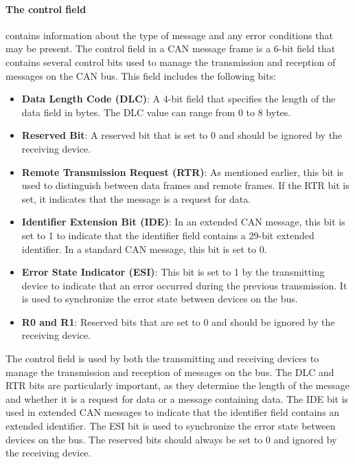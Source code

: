 \paragraph*{The control field} contains information about the type of message and any error conditions that may be present. 
The control field in a CAN message frame is a 6-bit field that contains several control bits used to manage the transmission and reception of messages on the CAN bus. 
This field includes the following bits:

\begin{itemize}
    \item \textbf{Data Length Code (DLC)}: A 4-bit field that specifies the length of the data field in bytes. The DLC value can range from 0 to 8 bytes.
    \item \textbf{Reserved Bit}: A reserved bit that is set to 0 and should be ignored by the receiving device.
    \item \textbf{Remote Transmission Request (RTR)}: As mentioned earlier, this bit is used to distinguish between data frames and remote frames. If the RTR bit is set, it indicates that the message is a request for data.
    \item \textbf{Identifier Extension Bit (IDE)}: In an extended CAN message, this bit is set to 1 to indicate that the identifier field contains a 29-bit extended identifier. In a standard CAN message, this bit is set to 0.
    \item \textbf{Error State Indicator (ESI)}: This bit is set to 1 by the transmitting device to indicate that an error occurred during the previous transmission. It is used to synchronize the error state between devices on the bus.
    \item \textbf{R0 and R1}: Reserved bits that are set to 0 and should be ignored by the receiving device.
\end{itemize}

The control field is used by both the transmitting and receiving devices to manage the transmission and reception of messages on the bus. 
The DLC and RTR bits are particularly important, as they determine the length of the message and whether it is a request for data or a message containing data. 
The IDE bit is used in extended CAN messages to indicate that the identifier field contains an extended identifier. 
The ESI bit is used to synchronize the error state between devices on the bus. 
The reserved bits should always be set to 0 and ignored by the receiving device.

